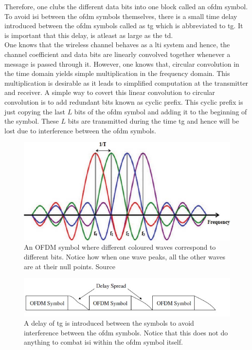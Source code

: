 Therefore, one clubs the different data bits into one block called an \acrshort{ofdm} symbol. To avoid \acrshort{isi} between the \acrshort{ofdm} symbols themselves, there is a small time delay introduced between the \acrshort{ofdm} symbols called as \acrlong{tg} which is abbreviated to \acrshort{tg}. It is important that this delay, is atleast as large as the \acrlong{td}.\\
One knows that the wireless channel behaves as a \acrlong{lti} system and hence, the channel coefficient and data bits are linearly convolved together whenever a message is passed through it. However, one knows that, circular convolution in the time domain yields simple multiplication in the frequency domain. This multiplication is desirable as it leads to simplified computation at the transmitter and receiver. A simple way to covert this linear convolution to circular convolution is to add redundant bits known as \gls{cyclic prefix}. This cyclic prefix is just copying the last $L$ bits of the \acrshort{ofdm} symbol and adding it to the beginning of the symbol. These $L$ bits are transmitted during the time \acrshort{tg} and hence will be lost due to interference between the \acrshort{ofdm} symbols.\\

\begin{figure}[!htbp]
\centering
\includegraphics[scale=1]{Chapter 2/Figures/OFDM Orthogonality}
\caption[Orthogonality in OFDM]{An OFDM symbol where different coloured waves correspond to different bits. Notice how when one wave peaks, all the other waves are at their null points. Source \textcite{Ghosh2010}}
\label{fig:ofdm orthogonal waves}
\end{figure}

\begin{figure}[!htbp]
\centering
\includegraphics[scale=1]{Chapter 2/Figures/OFDM Symbol Timing}
\caption[Guard Time between OFDM symbols]{A delay of \acrshort{tg} is introduced between the symbols to avoid interference between the \acrshort{ofdm} symbols. Notice that this does not do anything to combat \acrshort{isi} within the \acrshort{ofdm} symbol itself.}
\label{fig:ofdm symbol timing}
\end{figure}

